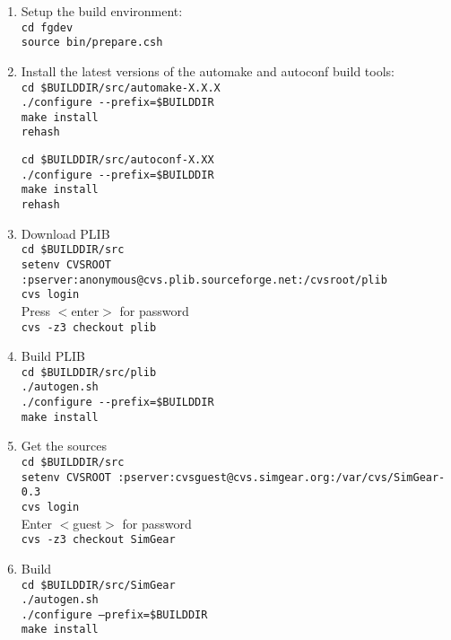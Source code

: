 \begin{enumerate}
\item Setup the build environment:\\
 \texttt{cd fgdev}\\
 \texttt{source bin/prepare.csh}

\item Install the latest versions of the automake and autoconf build tools:\\
 \texttt{cd {\$}BUILDDIR/src/automake-X.X.X}\\
 \texttt{./configure -$ $-prefix={\$}BUILDDIR}\\
 \texttt{make install}\\
  \texttt{rehash}
  
 \texttt{cd {\$}BUILDDIR/src/autoconf-X.XX}\\
 \texttt{./configure -$ $-prefix={\$}BUILDDIR}\\
 \texttt{make install}\\
  \texttt{rehash}
  
\item Download PLIB\\
 \texttt{cd {\$}BUILDDIR/src} \\
 \texttt{setenv CVSROOT :pserver:anonymous@cvs.plib.sourceforge.net:/cvsroot/plib}\\
 \texttt{cvs login}\\
 Press $<$enter$>$ for password\\
 \texttt{cvs -z3 checkout plib} 

\item Build PLIB\\
 \texttt{cd {\$}BUILDDIR/src/plib}\\
 \texttt{./autogen.sh}\\
  \texttt{./configure -$ $-prefix={\$}BUILDDIR}\\
 \texttt{make install}

\item Get the \SimGear{} sources\\
 \texttt{cd {\$}BUILDDIR/src}\\
 \texttt{setenv CVSROOT :pserver:cvsguest@cvs.simgear.org:/var/cvs/SimGear-0.3}\\
 \texttt{cvs login}\\
 Enter $<$guest$>$ for password\\
 \texttt{cvs -z3 checkout SimGear}\\
 
\item Build \SimGear{}\\
 \texttt{cd {\$}BUILDDIR/src/SimGear}\\
 \texttt{./autogen.sh}\\
 \texttt{./configure --prefix={\$}BUILDDIR}\\
 \texttt{make install}\\
 

\end{enumerate}

